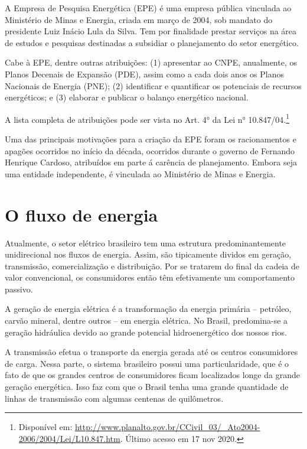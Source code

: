 \documentclass[grad,numbers]{coppe}
\begin{document}
  A Empresa de Pesquisa Energética (EPE) é uma empresa pública vinculada ao Ministério de Minas e Energia, criada em março de 2004, sob mandato do presidente Luiz Inácio Lula da Silva. Tem por finalidade prestar serviços na área de estudos e pesquisas destinadas a subsidiar o planejamento do setor energético.

  Cabe à EPE, dentre outras atribuições: (1) apresentar ao CNPE, anualmente, os Planos Decenais de Expansão (PDE), assim como a cada dois anos os Planos Nacionais de Energia (PNE); (2) identificar e quantificar os potenciais de recursos energéticos; e (3) elaborar e publicar o balanço energético nacional.

  A lista completa de atribuições pode ser vista no Art. 4° da Lei n° 10.847/04.\footnote{Disponível em: \url{http://www.planalto.gov.br/CCivil_03/_Ato2004-2006/2004/Lei/L10.847.htm}. Último acesso em 17 nov 2020.}

  Uma das principais motivações para a criação da EPE foram os racionamentos e apagões ocorridos no início da década, ocorridos durante o governo de Fernando Henrique Cardoso, atribuídos em parte á carência de planejamento. Embora seja uma entidade independente, é vinculada ao Ministério de Minas e Energia.

  \hypertarget{o-fluxo-de-energia}{%
  \section{O fluxo de energia}\label{o-fluxo-de-energia}}

  Atualmente, o setor elétrico brasileiro tem uma estrutura predominantemente unidirecional nos fluxos de energia. Assim, são tipicamente dividos em geração, transmissão, comercialização e distribuição. Por se tratarem do final da cadeia de valor convencional, os consumidores então têm efetivamente um comportamento passivo.

  A geração de energia elétrica é a transformação da energia primária -- petróleo, carvão mineral, dentre outros -- em energia elétrica. No Brasil, predomina-se a geração hidráulica devido ao grande potencial hidroenergético dos nossos rios.

  A transmissão efetua o transporte da energia gerada até os centros consumidores de carga. Nessa parte, o sistema brasileiro possui uma particularidade, que é o fato de que os grandes centros de consumidores ficam localizados longe da grande geração energética. Isso faz com que o Brasil tenha uma grande quantidade de linhas de transmissão com algumas centenas de quilômetros.
\end{document}
